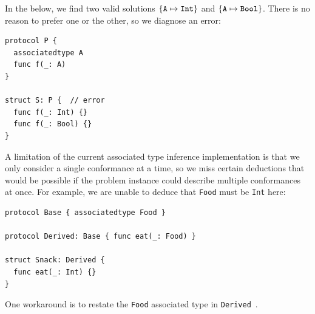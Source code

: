 \documentclass[../generics]{subfiles}
\begin{document}
\begin{example}\label{ambiguous associated type example}
In the below, we find two valid solutions $\{\texttt{A} \mapsto \texttt{Int}\}$ and $\{\texttt{A} \mapsto \texttt{Bool}\}$. There is no reason to prefer one or the other, so we diagnose an error:
\begin{Verbatim}
protocol P {
  associatedtype A
  func f(_: A)
}

struct S: P {  // error
  func f(_: Int) {}
  func f(_: Bool) {}
}
\end{Verbatim}
\end{example}

\begin{example}\label{ex:restate assoc type infer}
A limitation of the current associated type inference implementation is that we only consider a single conformance at a time, so we miss certain deductions that would be possible if the problem instance could describe multiple conformances at once. For example, we are unable to deduce that \texttt{Food} must be \texttt{Int} here:
\begin{Verbatim}
protocol Base { associatedtype Food }

protocol Derived: Base { func eat(_: Food) }

struct Snack: Derived {
  func eat(_: Int) {}
}
\end{Verbatim}
One workaround is to restate the \texttt{Food} associated type in \texttt{Derived}~\cite{sr2235}.
\end{example}
\end{document}
